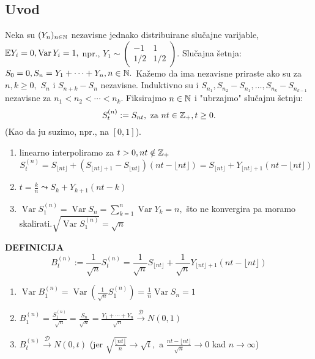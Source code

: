 \documentclass{article}
\newcommand{\Var}{\operatorname{Var}}
\begin{document}
\subsection{Uvod} 
Neka su \((Y_n)_{n\in\Bbb N}\) nezavisne jednako distribuirane slučajne varijable, \(\Bbb EY_i=0,\Var Y_i=1,\) npr., \(Y_1\sim\begin{pmatrix}-1&1\\1/2&1/2\end{pmatrix}.\) Slučajna šetnja: \(S_0=0,S_n=Y_1+\cdots+Y_n,n\in\Bbb N.\) Kažemo da ima nezavisne priraste ako su za \(n,k\ge 0,\) \(S_n\) i \(S_{n+k}-S_n\) nezavisne. Induktivno su i \(S_{n_1},S_{n_2}-S_{n_1},\ldots,S_{n_k}-S_{n_{k-1}}\) nezavisne za \(n_1<n_2<\cdots<n_k.\) Fiksirajmo \(n\in\Bbb N\) i "ubrzajmo" slučajnu šetnju: \[S_t^{(n)}:=S_{nt},\text{ za }nt\in\Bbb Z_+,t\ge0.\] (Kao da ju suzimo, npr., na \([0,1]\)).
\begin{enumerate}
    \item[\ding{228}] linearno interpoliramo  za \(t>0,nt\notin\Bbb Z_+\) \[S_t^{(n)}=S_{\lfloor nt\rfloor}+\left(S_{\lfloor nt\rfloor+1}-S_{\lfloor nt\rfloor}\right)\left(nt-\lfloor nt\rfloor\right)=S_{\lfloor nt\rfloor}+Y_{\lfloor nt\rfloor+1}\left(nt-\lfloor nt\rfloor\right)\] 
    \item[] \(t=\frac{k}n\leadsto S_k+Y_{k+1}(nt-k)\)
    \item[] \(\Var S_1^{(n)}=\Var S_n=\sum_{k=1}^n\Var Y_k=n,\) što ne konvergira pa moramo skalirati.\newline \(\sqrt{\Var S_1^{(n)}}=\sqrt n\)
\end{enumerate}
\textbf{DEFINICIJA} \[B_t^{(n)}:=\frac1{\sqrt n}S_t^{(n)}=\frac1{\sqrt n}S_{\lfloor nt\rfloor}+\frac1{\sqrt n}Y_{\lfloor nt\rfloor+1}\left(nt-\lfloor nt\rfloor\right)\]
\begin{enumerate}
    \item[] \(\Var B_1^{(n)}=\Var\left(\frac1{\sqrt n}S_1^{(n)}\right)=\frac1n\Var S_n=1\) 
    \item[] \(B_1^{(n)}=\frac{S_1^{(n)}}{\sqrt n}=\frac{S_n}{\sqrt n}=\frac{Y_1+\cdots+Y_n}{\sqrt n}\overset{\mathcal D}{\longrightarrow}N(0,1)\)
    \item[] \(B_t^{(n)}\overset{\mathcal D}{\longrightarrow}N(0,t)\) (jer \(\sqrt{\frac{\lfloor nt\rfloor}n}\to\sqrt t,\) a \(\frac{nt-\lfloor nt\rfloor}{\sqrt n}\to0\) kad \(n\to\infty\))
\end{enumerate}
\end{document}
